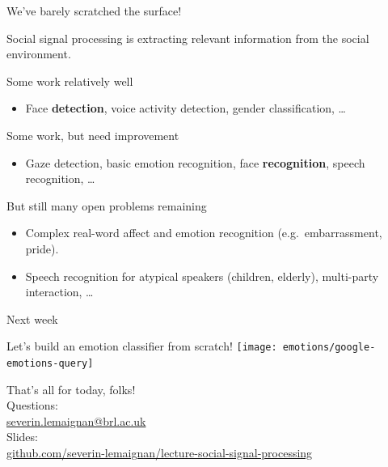 \documentclass[compress]{beamer}
\makeatletter
\def\beamer@writeslidentry@miniframesoff{%
  \expandafter\beamer@ifempty\expandafter{\beamer@framestartpage}{}%
  {%
    \clearpage\beamer@notesactions%
  }
}
\newcommand*{\miniframesoff}{\let\beamer@writeslidentry=\beamer@writeslidentry@miniframesoff}
\makeatother
\begin{document}
\begin{frame}{We've barely scratched the surface!}

Social signal processing is extracting relevant information from the
social environment.

Some work relatively well

\begin{itemize}

\item Face \textbf{detection}, voice activity detection, gender
  classification, \ldots{}
\end{itemize}

Some work, but need improvement

\begin{itemize}

\item Gaze detection, basic emotion recognition, face \textbf{recognition},
  speech recognition, \ldots{}
\end{itemize}

But still many open problems remaining

\begin{itemize}

\item Complex real-word affect and emotion recognition (e.g.~embarrassment,
  pride).
\item Speech recognition for atypical speakers (children, elderly),
  multi-party interaction, \ldots{}
\end{itemize}

\end{frame}


\miniframesoff

\begin{frame}{Next week}
    \begin{center}
        \Large
        Let's build an emotion classifier from scratch!
        \vspace{2cm}
        \texttt{[image: emotions/google-emotions-query]}
    \end{center}
\end{frame}

\begin{frame}{}
    \begin{center}
        \Large
        That's all for today, folks!\\[2em]
        \normalsize
        Questions:\\
        \url{severin.lemaignan@brl.ac.uk} \\[1em]

        Slides:\\ \href{https://github.com/severin-lemaignan/lecture-social-signal-processing}{\small github.com/severin-lemaignan/lecture-social-signal-processing}

    \end{center}
\end{frame}
\end{document}
